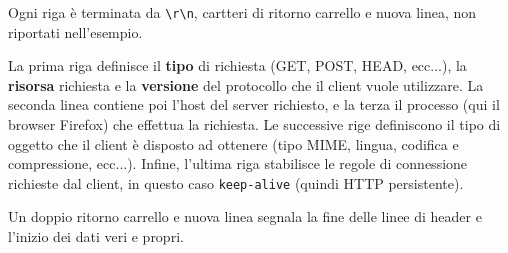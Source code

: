 \documentclass[a4paper,11pt]{article}
\begin{document}
Ogni riga è terminata da \lstinline|\r\n|, cartteri di ritorno carrello e nuova linea, non riportati nell'esempio.

La prima riga definisce il \textbf{tipo} di richiesta (GET, POST, HEAD, ecc...), la \textbf{risorsa} richiesta e la \textbf{versione} del protocollo che il client vuole utilizzare. 
La seconda linea contiene poi l'host del server richiesto, e la terza il processo (qui il browser Firefox) che effettua la richiesta.
Le successive rige definiscono il tipo di oggetto che il client è disposto ad ottenere (tipo MIME, lingua, codifica e compressione, ecc...).
Infine, l'ultima riga stabilisce le regole di connessione richieste dal client, in questo caso \lstinline|keep-alive| (quindi HTTP persistente).

Un doppio ritorno carrello e nuova linea segnala la fine delle linee di header e l'inizio dei dati veri e propri.
\end{document}
